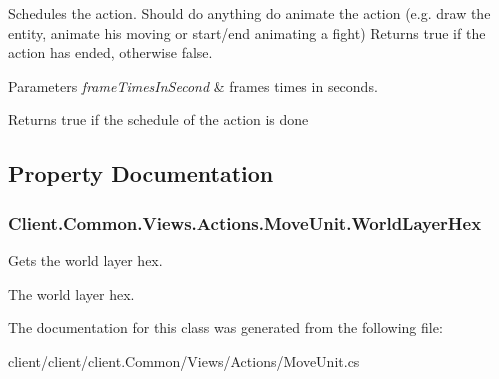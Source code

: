 Schedules the action. Should do anything do animate the action (e.\+g. draw the entity, animate his moving or start/end animating a fight) Returns true if the action has ended, otherwise false. 


\begin{DoxyParams}{Parameters}
{\em frame\+Times\+In\+Second} & frames times in seconds.\\
\hline
\end{DoxyParams}
\begin{DoxyReturn}{Returns}
true if the schedule of the action is done
\end{DoxyReturn}


\subsection{Property Documentation}
\hypertarget{classClient_1_1Common_1_1Views_1_1Actions_1_1MoveUnit_aa04818e2ad221d2afb995ebb617fd82b}{}
\subsubsection[{World\+Layer\+Hex}]{ Client.\+Common.\+Views.\+Actions.\+Move\+Unit.\+World\+Layer\+Hex\hspace{0.3cm}{\ttfamily [get]}}\label{classClient_1_1Common_1_1Views_1_1Actions_1_1MoveUnit_aa04818e2ad221d2afb995ebb617fd82b}


Gets the world layer hex. 

The world layer hex.

The documentation for this class was generated from the following file\+:\begin{DoxyCompactItemize}
\item 
client/client/client.\+Common/\+Views/\+Actions/Move\+Unit.\+cs\end{DoxyCompactItemize}

